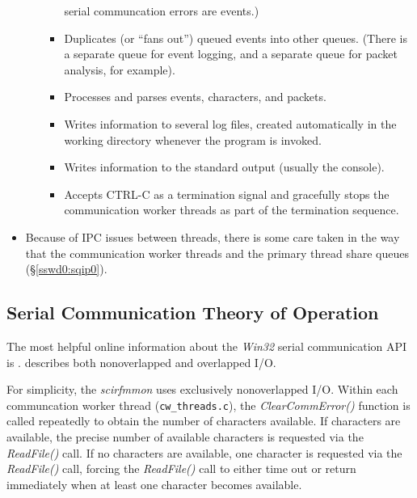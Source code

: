 \documentclass[letterpaper,10pt,titlepage]{article}
\newcommand{\productname}{scirfmmon}
\newcommand{\productnameemph}{\emph{\productname}}
\begin{document}
\begin{itemize}
\begin{itemize}
\begin{itemize}
                  serial communcation errors are events.)
            \item Duplicates (or ``fans out'') queued events into other queues.
                  (There is a
                  separate queue for event logging, and a separate queue for
                  packet analysis,
                  for example).
            \item Processes and parses events, characters, and packets.
            \item Writes information to several log files, created automatically in
                  the working directory whenever the program is invoked.
            \item Writes information to the standard output (usually the console).
            \item Accepts CTRL-C as a termination signal and gracefully stops the
                  communication worker threads as part of the termination sequence.
            \end{itemize}
      \end{itemize}
\item Because of IPC issues between threads, there is some care taken
      in the way that the communication worker threads and the
      primary thread share queues (\S{}\ref{sswd0:sqip0}).
\end{itemize}


\subsection{Serial Communication Theory of Operation}
\label{sswd0:ssct0}

The most helpful online information about the \emph{Win32} serial 
communication API is \cite{bibref:twp:ms810467}.  \cite{bibref:twp:ms810467}
describes
both nonoverlapped and overlapped I/O.

For simplicity, the \productnameemph{} uses exclusively nonoverlapped 
I/O\@.  Within each communcation worker thread (\texttt{cw\_threads.c}), the 
\emph{ClearCommError()} function is called repeatedly
to obtain the number of characters available.  If characters are available,
the precise number of available characters is requested via the 
\emph{ReadFile()} call.  If no characters are available,
one character is requested via the \emph{ReadFile()} call, forcing
the \emph{ReadFile()} call to either time out or return immediately
when at least one character becomes available.
\end{document}
